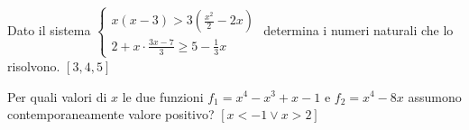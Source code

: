 \begin{esercizio}[\Ast]
\label{ese:4.82}
Dato il sistema $\left\{\begin{array}{l}{x(x-3)>3\left(\frac{x^2} 
2-2x\right)}\\{2+x\cdot \frac{3x-7} 3\ge 5-\frac 1 3x}\end{array}\right.$ 
determina i numeri naturali che lo risolvono. \hfill $\left[3, 4, 5\right]$
\end{esercizio}

\begin{esercizio}[\Ast]
 \label{ese:4.83}
Per quali valori di $ x $ le due funzioni $f_1=x^4-x^3+x-1$ e $f_2=x^4-8x$ 
assumono contemporaneamente valore positivo? \hfill $\left[x<-1\vee x>2\right]$
\end{esercizio}
